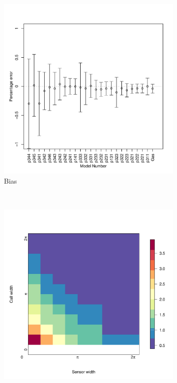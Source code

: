 \documentclass[a4paper,10pt,reqno,oneside]{amsart}
\begin{document}
\begin{figure}
	\centering
	\begin{subfigure}[t]{0.5\textwidth}
	\includegraphics[width=1\textwidth]{imgs/AverageModelBias.pdf}
	\caption{Bias}
	\label{f:ModelBias}
	\end{subfigure}
	~
	\begin{subfigure}[t]{0.5\textwidth}
		\includegraphics[width=1\textwidth]{imgs/ResultStandardDeviation.pdf}

\end{subfigure}
\end{figure}
\end{document}
